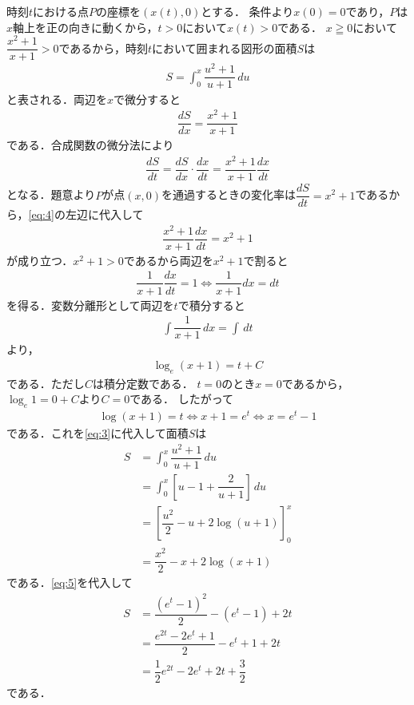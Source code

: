 \documentclass[../../main.tex]{subfiles}
\begin{document}
時刻$t$における点$P$の座標を$(x(t), 0)$とする．
条件より$x(0) = 0$であり，$P$は$x$軸上を正の向きに動くから，$t > 0$において$x(t) > 0$である．
$x \geqq 0$において$\dfrac{x^2+1}{x+1} > 0$であるから，時刻$t$において囲まれる図形の面積$S$は
\begin{align}
  S = \int_0^x \dfrac{u^2+1}{u+1} \, du \label{eq:3}
\end{align}
と表される．両辺を$x$で微分すると
\begin{align}
  \dfrac{dS}{dx} = \dfrac{x^2+1}{x+1}
\end{align}
である．合成関数の微分法により
\begin{align}
  \dfrac{dS}{dt} = \dfrac{dS}{dx} \cdot \dfrac{dx}{dt} = \dfrac{x^2+1}{x+1} \dfrac{dx}{dt} \label{eq:4}
\end{align}
となる．題意より$P$が点$(x, 0)$を通過するときの変化率は$\dfrac{dS}{dt} = x^2+1$であるから，\cref{eq:4}の左辺に代入して
\begin{align}
  \dfrac{x^2+1}{x+1} \dfrac{dx}{dt} = x^2+1
\end{align}
が成り立つ．$x^2+1 > 0$であるから両辺を$x^2+1$で割ると
\begin{align}
  \dfrac{1}{x+1} \dfrac{dx}{dt} = 1 \Longleftrightarrow \dfrac{1}{x+1}dx = dt
\end{align}
を得る．変数分離形として両辺を$t$で積分すると
\begin{align}
  \int \dfrac{1}{x+1} \, dx = \int \, dt
\end{align}
より，
\begin{align}
  \log_e(x+1) = t + C
\end{align}
である．ただし$C$は積分定数である．
$t = 0$のとき$x = 0$であるから，$\log_e 1 = 0 + C$より$C = 0$である．
したがって
\begin{align}
  \log(x+1) = t \Longleftrightarrow x+1 = e^t \Longleftrightarrow x = e^t - 1 \label{eq:5}
\end{align}
である．これを\cref{eq:3}に代入して面積$S$は
\begin{align}
  S
  &= \int_0^x \dfrac{u^2+1}{u+1} \, du \\
  &= \int_0^x \left[u - 1 + \dfrac{2}{u+1}\right]\, du \\
  &= \left[ \dfrac{u^2}{2} - u + 2\log(u+1) \right]_0^x \\
  &= \dfrac{x^2}{2} - x + 2\log(x+1)
\end{align}
である．\cref{eq:5}を代入して
\begin{align}
  S &= \dfrac{(e^t - 1)^2}{2} - (e^t - 1) + 2t \nonumber\\
  &= \dfrac{e^{2t} - 2e^t + 1}{2} - e^t + 1 + 2t \nonumber\\
  &= \dfrac{1}{2}e^{2t} - 2e^t + 2t + \dfrac{3}{2} \tag{答}
\end{align}
である．
\end{document}
